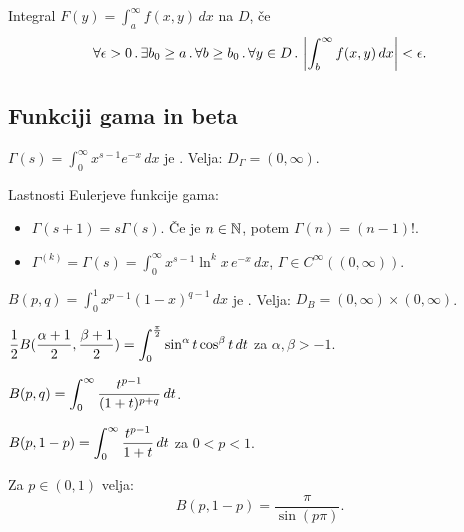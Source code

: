 \begin{definicija}
    Integral \(F(y) = \int_{a}^{\infty} f(x,y) \, dx\)  na \(D\), če 
    $$\forall \epsilon > 0 \,.\, \exists b_0 \geq a \,.\, \forall b \geq b_0 \,.\, \forall y \in D \,.\, \left|\int_{b}^{\infty} f(x,y) \, dx \right| < \epsilon.$$
\end{definicija}

\subsection{Funkciji gama in beta}
\begin{definicija}
    $\Gamma (s) = \int_{0}^{\infty} x^{s-1}e^{-x} \, dx$ je . Velja: $D_\Gamma = (0, \infty)$.
\end{definicija}

\begin{trditev}
    Lastnosti Eulerjeve funkcije gama:
    \begin{itemize}
        \item \(\Gamma(s+1) = s \Gamma(s)\). Če je \(n \in \mathbb{N}\), potem \(\Gamma(n) = (n-1)!\).
        \item \(\Gamma^{(k)} = \Gamma (s) = \int_{0}^{\infty} x^{s-1} \ln^k x \, e^{-x} \, dx\), \(\Gamma \in C^\infty ((0, \infty))\).
    \end{itemize}
\end{trditev}

\begin{definicija}
    \( B(p,q) = \int_{0}^{1}x^{p-1}(1-x)^{q-1} \, dx\) je . Velja: \(D_B = (0, \infty) \times (0, \infty)\).
\end{definicija}

\begin{trditev}
    \(\displaystyle \frac{1}{2} B(\frac{\alpha + 1}{2}, \frac{\beta + 1}{2}) = \int_{0}^{\frac{\pi}{2}} \sin^\alpha t \cos^\beta t \, dt\) za \(\alpha, \beta > -1\).
\end{trditev}

\begin{trditev}
    \(\displaystyle B(p,q) = \int_{0}^{\infty} \frac{t^{p-1}}{(1+t)^{p+q}} \, dt\).
\end{trditev}

\begin{posledica}
    \(\displaystyle B(p, 1-p) = \int_{0}^{\infty} \frac{t^{p-1}}{1+t} \, dt\) za \(0<p<1\).
\end{posledica}

\begin{opomba}
    Za \(p \in (0,1)\) velja: \[B(p, 1-p) = \frac{\pi}{\sin (p \pi)}.\]
\end{opomba}

